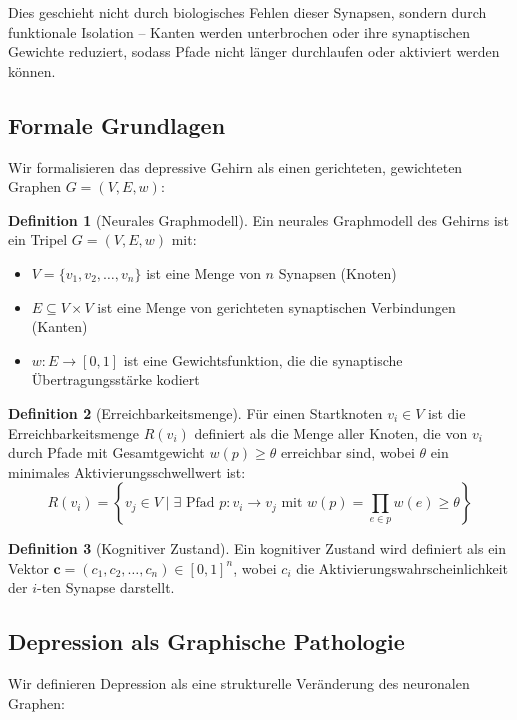 \documentclass[a4paper,12pt]{article}
\theoremstyle{definition}
\newtheorem{definition}{Definition}
\begin{document}
Dies geschieht nicht durch biologisches Fehlen dieser Synapsen, sondern durch funktionale Isolation -- Kanten werden unterbrochen oder ihre synaptischen Gewichte reduziert, sodass Pfade nicht länger durchlaufen oder aktiviert werden können.

\subsection{Formale Grundlagen}

Wir formalisieren das depressive Gehirn als einen gerichteten, gewichteten Graphen $G = (V, E, w)$:

\begin{definition}[Neurales Graphmodell]
Ein neurales Graphmodell des Gehirns ist ein Tripel $G = (V, E, w)$ mit:
\begin{itemize}
	\item $V = \{v_1, v_2, \ldots, v_n\}$ ist eine Menge von $n$ Synapsen (Knoten)
	\item $E \subseteq V \times V$ ist eine Menge von gerichteten synaptischen Verbindungen (Kanten)
	\item $w: E \rightarrow [0, 1]$ ist eine Gewichtsfunktion, die die synaptische Übertragungsstärke kodiert
\end{itemize}
\end{definition}

\begin{definition}[Erreichbarkeitsmenge]
Für einen Startknoten $v_i \in V$ ist die Erreichbarkeitsmenge $R(v_i)$ definiert als die Menge aller Knoten, die von $v_i$ durch Pfade mit Gesamtgewicht $w(p) \geq \theta$ erreichbar sind, wobei $\theta$ ein minimales Aktivierungsschwellwert ist:
\[
R(v_i) = \left\{ v_j \in V \mid \exists \text{ Pfad } p: v_i \to v_j \text{ mit } w(p) = \prod_{e \in p} w(e) \geq \theta \right\}
\]
\end{definition}

\begin{definition}[Kognitiver Zustand]
Ein kognitiver Zustand wird definiert als ein Vektor $\mathbf{c} = (c_1, c_2, \ldots, c_n) \in [0,1]^n$, wobei $c_i$ die Aktivierungswahrscheinlichkeit der $i$-ten Synapse darstellt.
\end{definition}

\subsection{Depression als Graphische Pathologie}

Wir definieren Depression als eine strukturelle Veränderung des neuronalen Graphen:
\end{document}
